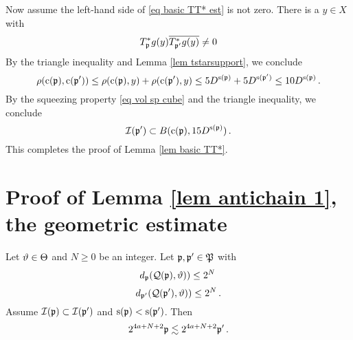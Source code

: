Now assume the left-hand side of \eqref{eq basic TT* est} is not zero.
There is a $y\in X$ with
\begin{equation}
    T^*_{\mathfrak p}g(y)\overline{T^*_{\mathfrak p'}g(y)}\neq 0
\end{equation}
By the triangle inequality and Lemma \ref{lem tstarsupport}, we conclude
\begin{equation}
    \rho(\mathrm{c}(\mathfrak p),\mathrm{c}(\mathfrak p'))\le  \rho(\mathrm{c}(\mathfrak p),y) +\rho(\mathrm{c}(\mathfrak p'),y)
    \le 5D^{\mathrm{s}(\mathfrak p)}+5D^{\mathrm{s}(\mathfrak p')}\le 10 D^{\mathrm{s}(\mathfrak p)}\, .
\end{equation}
By the squeezing property \eqref{eq vol sp cube} and the triangle inequality,
we conclude
\begin{equation}
    \mathcal{I}(\mathfrak p') \subset B(\mathrm{c}(\mathfrak p), 15D^{\mathrm{s}(\mathfrak p)})\, .
\end{equation}
    This completes the proof of Lemma  \ref{lem basic TT*}.





\section{Proof of Lemma \ref{lem antichain 1}, the geometric estimate}
\label{subsec geolem}


\begin{lemma}\label{lem a geo}
Let $\vartheta\in \Theta$ and $N\ge0$ be an integer.
Let $\mathfrak p, \mathfrak p'\in \mathfrak P$ with
\begin{equation}\label{eqassumedismfa}
    d_{\mathfrak p}(\mathcal{Q}(\mathfrak p), \vartheta))\le 2^N\,
\end{equation}
\begin{equation}\label{eqassumedismfap}
    d_{\mathfrak p'}(\mathcal{Q}(\mathfrak p'), \vartheta))\le 2^N\, .
\end{equation}
Assume $\mathcal{I}(\mathfrak p)\subset \mathcal{I}(\mathfrak p')$ and $\mathrm{s}(\mathfrak p)<\mathrm{s}(\mathfrak p')$.
Then
\begin{equation}\label{lp'lp''}2^{4a+N+2}\mathfrak p\lesssim 2^{4a+N+2} \mathfrak p'\, .
\end{equation}
\end{lemma}

